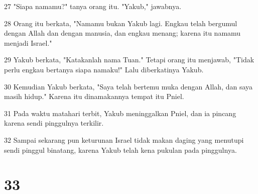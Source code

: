 \par 27 "Siapa namamu?" tanya orang itu. "Yakub," jawabnya.
\par 28 Orang itu berkata, "Namamu bukan Yakub lagi. Engkau telah bergumul dengan Allah dan dengan manusia, dan engkau menang; karena itu namamu menjadi Israel."
\par 29 Yakub berkata, "Katakanlah nama Tuan." Tetapi orang itu menjawab, "Tidak perlu engkau bertanya siapa namaku!" Lalu diberkatinya Yakub.
\par 30 Kemudian Yakub berkata, "Saya telah bertemu muka dengan Allah, dan saya masih hidup." Karena itu dinamakannya tempat itu Pniel.
\par 31 Pada waktu matahari terbit, Yakub meninggalkan Pniel, dan ia pincang karena sendi pinggulnya terkilir.
\par 32 Sampai sekarang pun keturunan Israel tidak makan daging yang menutupi sendi pinggul binatang, karena Yakub telah kena pukulan pada pinggulnya.

\chapter{33}

